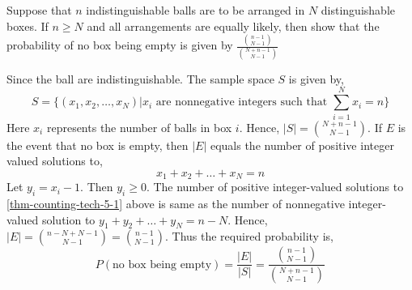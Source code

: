 \begin{example}
    Suppose that $n$ indistinguishable balls are to be arranged in $N$
distinguishable boxes. If $n \geq N$ and all arrangements are equally likely,
then show that the probability of no box being empty is given by
$\frac{{{n-1} \choose {N - 1}}}{{{N + n -1} \choose {N - 1}}}$
\end{example}
\begin{solution}
    Since the ball are indistinguishable. The sample space $S$ is given by,
    \begin{equation*}
        S = \lbrace (x_1, x_2, \dots, x_N) \vert x_i \text{ are nonnegative
                    integers such that } \sum_{i = 1}^N x_i = n \rbrace
    \end{equation*}
    Here $x_i$ represents the number of balls in box $i$. Hence, $\vert S
\vert = {{N + n - 1} \choose {N - 1}}$. If $E$ is the event that no box is
empty, then $\vert E \vert$ equals the number of positive integer valued
solutions to,
    \begin{equation}
        \label{thm-counting-tech-5-1}
        x_1 + x_2 + \dots + x_N = n
    \end{equation}
    Let $y_i = x_i - 1$. Then $y_i \geq 0$. The number of positive
integer-valued solutions to \ref{thm-counting-tech-5-1} above is same as the
number of nonnegative integer-valued solution to $y_1 + y_2 + \dots + y_N = n
- N$. Hence, $\vert E \vert = {{n -N + N - 1} \choose {N - 1}} = {{n - 1}
\choose {N - 1}}$. Thus the required probability is, 
    \begin{equation*}
          P(\text{no box being empty}) 
        = \frac{\vert E \vert}{\vert S \vert}
        = \frac{{{n - 1}\choose {N - 1}}}{{{N + n - 1} \choose {N - 1}}}
    \end{equation*}
\end{solution}